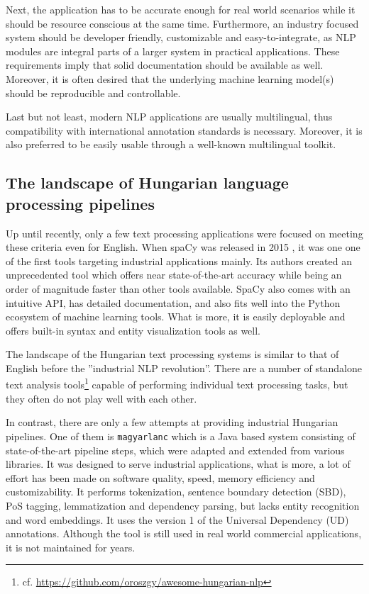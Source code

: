 \documentclass{llncs}
\newcommand{\magyarlanc}{\texttt{magyarlanc}}
\begin{document}
Next, the application has to be accurate enough for real world scenarios while it should be resource conscious at the same time. Furthermore, an industry focused system should be developer friendly, customizable and easy-to-integrate, as NLP modules are integral parts of a larger system in practical applications. These requirements imply that solid documentation should be available as well. Moreover, it is often desired that the underlying machine learning model(s) should be reproducible and controllable.

Last but not least, modern NLP applications are usually multilingual, thus compatibility with international annotation standards  \citep{udpos,univedepv1,UniDep,unimorph} is necessary. Moreover, it is also preferred to be easily usable through a well-known multilingual toolkit.


\subsection{The landscape of Hungarian language processing pipelines}

Up until recently, only a few text processing applications were focused on meeting these criteria even for English. When spaCy was released in 2015 \citep{spacy}, it was one one of the first tools targeting industrial applications mainly. Its authors created an unprecedented tool which offers near state-of-the-art accuracy while being an order of magnitude faster than other tools available. SpaCy also comes with an intuitive API, has detailed documentation, and also fits well into the Python ecosystem of machine learning tools. What is more, it is easily deployable and offers built-in syntax and entity visualization tools as well.

The landscape of the Hungarian text processing systems is similar to that of English before the ''industrial NLP revolution''. There are a number of standalone text analysis tools\footnote{cf. \url{https://github.com/oroszgy/awesome-hungarian-nlp}} \citep{metanet} capable of performing individual text processing tasks, but they often do not play well with each other. 

In contrast, there are only a few attempts at providing industrial Hungarian pipelines. One of them is \magyarlanc{} \citep{magyaralanc} which is a Java based system consisting of state-of-the-art pipeline steps, which were adapted and extended from various libraries. It was designed to serve industrial applications, what is more, a lot of effort has been made on software quality, speed, memory efficiency and customizability. It performs tokenization, sentence boundary detection (SBD), PoS tagging, lemmatization and dependency parsing, but lacks entity recognition and word embeddings. It uses the version 1 of the Universal Dependency (UD) annotations. Although the tool is still used in real world commercial applications, it is not maintained for years.
\end{document}
